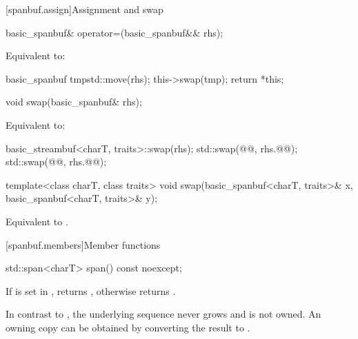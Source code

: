 [spanbuf.assign]{Assignment and swap}

%
\begin{itemdecl}
basic_spanbuf& operator=(basic_spanbuf&& rhs);
\end{itemdecl}

\begin{itemdescr}
\pnum
\effects
Equivalent to:
\begin{codeblock}
basic_spanbuf tmp{std::move(rhs)};
this->swap(tmp);
return *this;
\end{codeblock}
\end{itemdescr}

%
\begin{itemdecl}
void swap(basic_spanbuf& rhs);
\end{itemdecl}

\begin{itemdescr}
\pnum
\effects
Equivalent to:
\begin{codeblock}
basic_streambuf<charT, traits>::swap(rhs);
std::swap(@@, rhs.@@);
std::swap(@@, rhs.@@);
\end{codeblock}
\end{itemdescr}

%
\begin{itemdecl}
template<class charT, class traits>
  void swap(basic_spanbuf<charT, traits>& x, basic_spanbuf<charT, traits>& y);
\end{itemdecl}

\begin{itemdescr}
\pnum
\effects
Equivalent to .
\end{itemdescr}

[spanbuf.members]{Member functions}

%
\begin{itemdecl}
std::span<charT> span() const noexcept;
\end{itemdecl}

\begin{itemdescr}
\pnum
\returns
If  is set in ,
returns ,
otherwise returns .

\begin{note}
In contrast to ,
the underlying sequence never grows and is not owned.
An owning copy can be obtained
by converting the result to .
\end{note}
\end{itemdescr}

